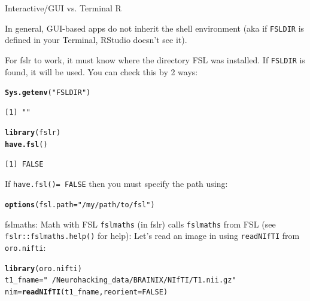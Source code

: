 \documentclass[11pt]{beamer}\usepackage[]{graphicx}\usepackage[]{color}
\makeatletter
\newcommand{\hlnum}[1]{\textcolor[rgb]{0.686,0.059,0.569}{#1}}%
\newcommand{\hlstr}[1]{\textcolor[rgb]{0.192,0.494,0.8}{#1}}%
\newcommand{\hlstd}[1]{\textcolor[rgb]{0.345,0.345,0.345}{#1}}%
\newcommand{\hlkwb}[1]{\textcolor[rgb]{0.69,0.353,0.396}{#1}}%
\newcommand{\hlkwc}[1]{\textcolor[rgb]{0.333,0.667,0.333}{#1}}%
\newcommand{\hlkwd}[1]{\textcolor[rgb]{0.737,0.353,0.396}{\textbf{#1}}}%
\newenvironment{kframe}{%
 \def\at@end@of@kframe{}%
 \ifinner\ifhmode%
  \def\at@end@of@kframe{\end{minipage}}%
  \begin{minipage}{\columnwidth}%
 \fi\fi%
 \def\FrameCommand##1{\hskip\@totalleftmargin \hskip-\fboxsep
 \colorbox{shadecolor}{##1}\hskip-\fboxsep
     \hskip-\linewidth \hskip-\@totalleftmargin \hskip\columnwidth}%
 \MakeFramed {\advance\hsize-\width
   \@totalleftmargin\z@ \linewidth\hsize
   \@setminipage}}%
 {\par\unskip\endMakeFramed%
 \at@end@of@kframe}
\newenvironment{knitrout}{}{} %
\makeatother
\begin{document}
\begin{frame}[fragile]{Interactive/GUI vs. Terminal R}

In general, GUI-based apps do not inherit the shell environment (aka if \verb|FSLDIR| is defined in your Terminal, RStudio doesn't see it).

For fslr to work, it must know where the directory FSL was installed.  If \verb|FSLDIR| is found, it will be used.  You can check this by 2 ways:

\begin{knitrout}
\color{fgcolor}\begin{kframe}
\begin{alltt}
\hlkwd{Sys.getenv}\hlstd{(}\hlstr{"FSLDIR"}\hlstd{)}
\end{alltt}
\begin{verbatim}
[1] ""
\end{verbatim}
\begin{alltt}
\hlkwd{library}\hlstd{(fslr)}
\hlkwd{have.fsl}\hlstd{()}
\end{alltt}
\begin{verbatim}
[1] FALSE
\end{verbatim}
\end{kframe}
\end{knitrout}

If \verb|have.fsl()= FALSE| then you must specify the path using:

\begin{knitrout}
\color{fgcolor}\begin{kframe}
\begin{alltt}
\hlkwd{options}\hlstd{(}\hlkwc{fsl.path}\hlstd{=}\hlstr{"/my/path/to/fsl"}\hlstd{)}
\end{alltt}
\end{kframe}
\end{knitrout}



\end{frame}


\begin{frame}[fragile]{fslmaths: Math with FSL}
\verb|fslmaths| (in fslr) calls \verb|fslmaths| from FSL (see \verb|fslr::fslmaths.help()| for help):
Let's read an image in using \verb|readNIfTI| from \verb|oro.nifti|:

\begin{knitrout}
\color{fgcolor}\begin{kframe}
\begin{alltt}
\hlkwd{library}\hlstd{(oro.nifti)}
\hlstd{t1_fname} \hlkwb{=} \hlstr{"~/Neurohacking_data/BRAINIX/NIfTI/T1.nii.gz"}
\hlstd{nim} \hlkwb{=} \hlkwd{readNIfTI}\hlstd{(t1_fname,} \hlkwc{reorient}\hlstd{=}\hlnum{FALSE}\hlstd{)}
\end{alltt}
\end{kframe}
\end{knitrout}
\end{frame}
\end{document}
